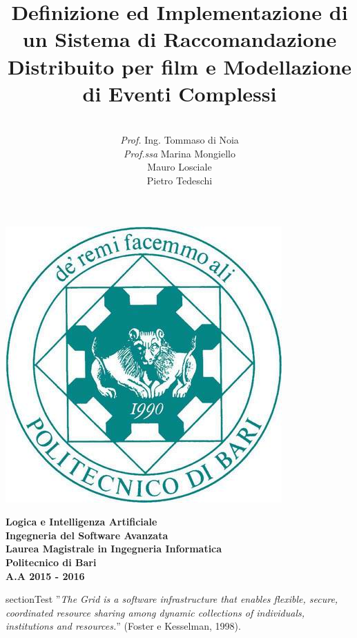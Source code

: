 \documentclass[11pt]{article}
\date{}
\begin{document}
\title{\textbf{Definizione ed Implementazione di un Sistema di Raccomandazione Distribuito per film
		e Modellazione di Eventi Complessi}}

\author{\\\textit{Prof.} Ing. Tommaso di Noia\\\textit{Prof.ssa} Marina Mongiello \\
	Mauro Losciale\\ 
	Pietro Tedeschi\\}

\clearpage\maketitle
\thispagestyle{empty}

\begin{center}
	\includegraphics[scale=0.40]{images/poliba.jpg}
\end{center}

{\textbf{\center Logica e Intelligenza Artificiale\\Ingegneria del Software Avanzata\\ Laurea Magistrale in Ingegneria Informatica\\Politecnico di Bari\\A.A 2015 - 2016\\}}

\newpage
\clearpage
\thispagestyle{empty}
\renewcommand\contentsname{Indice}
\tableofcontents
\newpage
\setcounter{page}{1}
section{Test}
''\emph{The Grid is a software infrastructure that enables flexible, secure, coordinated resource sharing among dynamic collections of individuals, institutions and resources.}'' (Foster e Kesselman, 1998).
\end{document}
